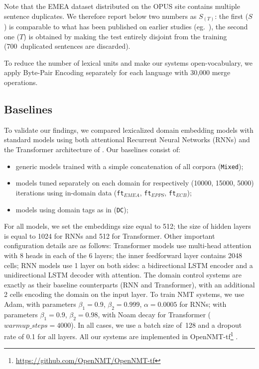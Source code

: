 Note that the EMEA dataset distributed on the OPUS site contains multiple sentence duplicates. 
We therefore report below two numbers as $S_{(T)}$: the first ($S$) is comparable to what has been published on earlier studies (eg.\ \cite{Zeng18multidomain}), the second one ($T$) is obtained by making the test entirely disjoint from the training (700~duplicated sentences are discarded).

To reduce the number of lexical units and make our systems open-vocabulary, we apply Byte-Pair Encoding \cite{Sennrich16neural} separately for each language with 30,000 merge operations. 

\subsection{Baselines \label{ssec:baselines}}
To validate our findings, we compared lexicalized domain embedding models with standard models using both attentional Recurrent Neural Networks (RNNs) \cite{Bahdanau15learning} and the Transformer architecture of \cite{Vaswani17attention}. Our baselines consist of:
\begin{itemize}
\item generic models trained with a simple concatenation of all corpora (\texttt{Mixed});
\item models tuned separately on each domain for respectively (10000, 15000, 5000) iterations using in-domain data (\texttt{ft$_{EMEA}$}, \texttt{ft$_{EPPS}$}, \texttt{ft$_{ECB}$}); 
\item models using domain tags as in \cite{Kobus17domain} (\texttt{DC}); 
\end{itemize}

For all models, we set the embeddings size equal to 512; the size of hidden layers is equal to 1024 for RNNs and 512 for Transformer. 
Other important configuration details are as follows:
Transformer models use multi-head attention with 8 heads in each of the 6 layers; 
the inner feedforward layer contains 2048 cells;  
RNN models use 1 layer on both sides: 
a bidirectional LSTM encoder and a unidirectional LSTM decoder with attention.
The domain control systems are exactly as their baseline counterparts (RNN and Transformer), with an additional 2 cells encoding the domain on the input layer.
To train NMT systems, we use Adam, with parameters $\beta_1=0.9$, $\beta_2 = 0.999$, $\alpha=0.0005$ for RNNs; with parameters $\beta_1=0.9$, $\beta_2= 0.98$, with Noam decay \cite{Vaswani17attention} for Transformer ($warmup\_steps=4000$). In all cases, we use a batch size of~128 and a dropout rate of 0.1 for all layers. 
All our systems are implemented in OpenNMT-tf\footnote{\url{https://github.com/OpenNMT/OpenNMT-tf}} \cite{Klein17opennmt}.


